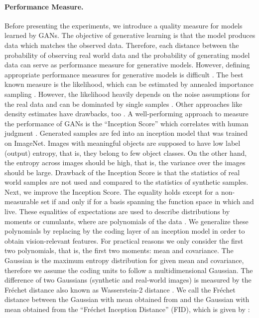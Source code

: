 \documentclass{article}
\begin{document}
\paragraph{Performance Measure.}
Before presenting the experiments, we introduce a quality measure
for models learned by GANs.
The objective of generative learning is that the model
produces data which matches the observed data.
Therefore, each distance between the probability of observing real world data
 and the probability of generating model data 
can serve as performance measure for generative models.
However, defining appropriate
performance measures for generative models is difficult \cite{Theis:15}.
The best known measure is the likelihood,
which can be estimated by annealed importance sampling \cite{Wu:16}.
However, the likelihood heavily depends on the noise assumptions
for the real data and can be dominated by single samples \cite{Theis:15}.
Other approaches like density estimates have drawbacks, too \cite{Theis:15}.
A well-performing approach to measure the performance of GANs
is the ``Inception Score'' which correlates with human
judgment \cite{Salimans:16}.
Generated samples are fed into an inception model that was trained on
ImageNet. Images with meaningful objects are supposed to have low
label (output) entropy, that is, they belong to few object classes.
On the other hand, the entropy across images should be high, that is,
the variance over the images should be large.
Drawback of the Inception Score is that
the statistics of real world samples are not used and compared to
the statistics of synthetic samples.
Next, we improve the Inception Score.
The equality  holds except for a non-measurable set
if and only if  for
a basis  spanning the function space in which  and 
live. These equalities of expectations are used to describe distributions
by moments or cumulants, where  are polynomials of the data .
We generalize these polynomials by replacing  by the coding layer of
an inception model in order to obtain vision-relevant features.
For practical reasons we only consider the first two polynomials, that
is, the first two moments: mean and covariance.
The Gaussian is the maximum entropy distribution for given
mean and covariance, therefore we assume the coding units to follow a
multidimensional Gaussian.
The difference of two Gaussians (synthetic and real-world images)
is measured by the Fr\'{e}chet
distance \cite{Frechet:57}
also known as Wasserstein-2 distance \cite{Wasserstein:69}.
We call the Fr\'{e}chet
distance  between the Gaussian with mean  obtained
from  and the Gaussian with mean  obtained
from  the ``Fr\'{e}chet Inception Distance'' (FID), which is
given by \cite{Dowson:82}:
\end{document}

